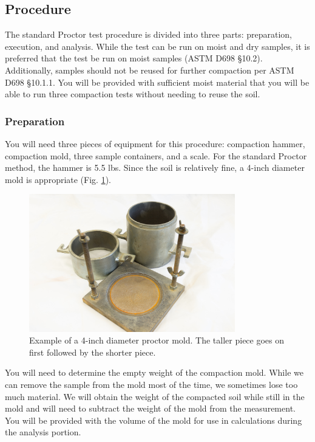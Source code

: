 \documentclass[12pt]{article}
\begin{document}
\pagebreak
\subsection{Procedure}
The standard Proctor test procedure is divided into three parts: preparation, execution, and analysis. While the test can be run on moist and dry samples, it is preferred that the test be run on moist samples (ASTM D698 \S10.2). Additionally, samples should not be reused for further compaction per ASTM D698 \S10.1.1. You will be provided with sufficient moist material that you will be able to run three compaction tests without needing to reuse the soil.

\subsubsection{Preparation}
You will need three pieces of equipment for this procedure: compaction hammer, compaction mold, three sample containers, and a scale. For the standard Proctor method, the hammer is 5.5 lbs. Since the soil is relatively fine, a 4-inch diameter mold is appropriate (Fig. \ref{fig:proctormold}).

\begin{figure}[H]
    \centering
    \includegraphics[width=0.8\textwidth]{GEO_5751.jpg}
    \caption{Example of a 4-inch diameter proctor mold. The taller piece goes on first followed by the shorter piece.}
    \label{fig:proctormold}
\end{figure}

You will need to determine the empty weight of the compaction mold. While we can remove the sample from the mold most of the time, we sometimes lose too much material. We will obtain the weight of the compacted soil while still in the mold and will need to subtract the weight of the mold from the measurement. You will be provided with the volume of the mold for use in calculations during the analysis portion.
\end{document}
